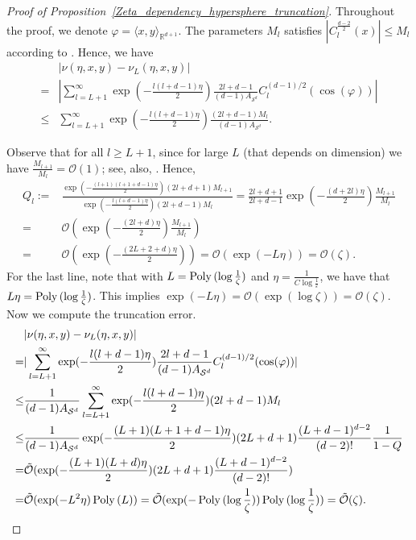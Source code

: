 \begin{proof}[Proof of Proposition~\ref{Zeta_dependency_hypersphere_truncation}]
    Throughout the proof, we denote $\varphi = \langle x, y \rangle_{\mathbb{R}^{d+1}}$.
    The parameters $M_{l}$ satisfies $|C_{l}^{\frac{d-2}{2}} (x)| \le M_{l}$ according to \citet[Proof of Theorem 1]{zhao2018exact}. 
    Hence, we have
    \begin{align*}
           & |\nu(\eta, x, y) - \nu_{L}(\eta, x, y)| \\
        =& |\sum_{l = L+1}^{\infty} \exp(-\frac{l(l+d-1)\eta}{2})\frac{2l+d - 1}{(d-1) A_{\mathcal{S}^{d}}} C_{l}^{(d-1)/2}(\cos (\varphi))| \\
        \le &\sum_{l = L+1}^{\infty} 
        \exp(-\frac{l(l+d-1)\eta}{2}) \frac{(2l+d - 1) M_{l}}{(d-1) A_{\mathcal{S}^{d}}}.
    \end{align*}

    Observe that for all $l \ge L+1$, since for large $L$ (that depends on dimension) 
    we have $ \frac{M_{l+1}}{M_{l}} = \mathcal{O}(1)$; see, also, \citet[Proof of Theorem 1]{zhao2018exact}. Hence,
    \begin{align*}
            Q_{l} := &\frac{\exp(-\frac{(l+1)(l+1+d-1)\eta}{2}) (2l+d + 1) M_{l+1}}{\exp(-\frac{l(l+d-1)\eta}{2}) (2l+d - 1) M_{l}} 
        = \frac{2l+d+1}{2l+d-1} \exp(-\frac{(d + 2l)\eta}{2}) \frac{M_{l+1}}{M_{l}} \\
        =& \mathcal{O}(\exp(-\frac{(2l + d)\eta}{2}) \frac{M_{l+1}}{M_{l}} ) \\
        =& \mathcal{O}(\exp(-\frac{(2L + 2 + d)\eta}{2}) )
        = \mathcal{O}(\exp(-L\eta)) = \mathcal{O}(\zeta).
    \end{align*}
    For the last line, note that with $L = \operatorname{Poly\,} (\log \frac{1}{\zeta})$ and $\eta = \frac{1}{C\log \frac{1}{\varepsilon}}$,
    we have that $L\eta = \operatorname{Poly\,} (\log \frac{1}{\zeta})$. 
    This implies $\exp(-L\eta) = \mathcal{O}(\exp (\log \zeta)) = \mathcal{O}(\zeta)$. 
    Now we compute the truncation error.
    \begin{align*}
            &|\nu(\eta, x, y) - \nu_{L}(\eta, x, y)|\\ 
            =& |\sum_{l = L+1}^{\infty} \exp(-\frac{l(l+d-1)\eta}{2})\frac{2l+d - 1}{(d-1) A_{\mathcal{S}^{d}}} C_{l}^{(d-1)/2}(\cos (\varphi))| \\
         \le & \frac{1}{(d-1) A_{\mathcal{S}^{d}}} \sum_{l = L+1}^{\infty} 
        \exp(-\frac{l(l+d-1)\eta}{2}) (2l+d - 1) M_{l} \\
         \le & \frac{1}{(d-1) A_{\mathcal{S}^{d}}} 
        \exp(-\frac{(L+1)(L+1+d-1)\eta}{2}) (2L+d + 1) \frac{(L+d-1)^{d-2}}{(d-2)!} \frac{1}{1-Q} \\
        = & \tilde{\mathcal{O}}(\exp(-\frac{(L+1)(L+d)\eta}{2}) (2L+d + 1) \frac{(L+d-1)^{d-2}}{(d-2)!}) \\
        =& \tilde{\mathcal{O}}(\exp(-L^2 \eta)\operatorname{Poly\,} (L) )
        = \tilde{\mathcal{O}}(\exp(-\operatorname{Poly\,} (\log \frac{1}{\zeta}))\operatorname{Poly\,} (\log \frac{1}{\zeta}) )
        = \tilde{\mathcal{O}}(\zeta).
    \end{align*}

\end{proof}


